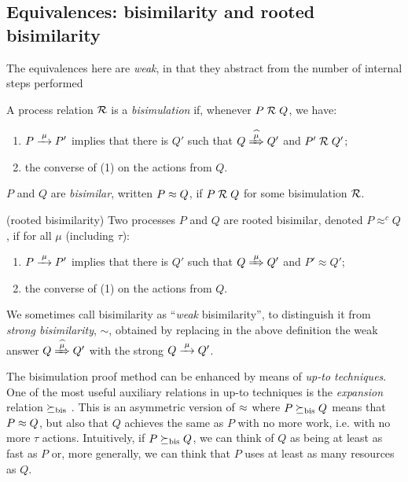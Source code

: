 \subsection{Equivalences: bisimilarity and rooted bisimilarity}
\label{ss:BiEx}

The equivalences here are 
 \emph{weak}, in that they
abstract from the number of internal steps performed
\begin{definition}[bisimilarity]
\label{d:wb}
A process relation ${{\cal R}}$ 
 is a \emph{bisimulation} if, whenever
 $P\mathrel{\cal R} Q$, %
we have:
\begin{enumerate}
\item 
    $P \arr\mu P'$   implies that there is $Q'$ such that $Q \Arcap \mu Q'$ and $P' \mathrel{\cal R} Q'$;
\item the converse of (1)
 on the actions from $Q$.
\end{enumerate}  
 $P$ and $Q$ are \emph{bisimilar},
written $P \approx
 Q$, if $P \mathrel{\cal R} Q$ for some  bisimulation ${\cal R}$.  
\end{definition} 

\begin{definition}{(rooted bisimilarity)}
Two processes $P$ and $Q$ are rooted bisimilar, denoted $P
\approx^c Q$, if for all $\mu$ (including $\tau$):
\begin{enumerate}
 \item  $P \arr\mu P'$   implies that there is $Q'$ such that $Q
   \Arr\mu Q'$ and $P' \approx Q'$;
\item the converse of (1) on the actions from $Q$.
\end{enumerate}
\end{definition}

We sometimes call bisimilarity as ``\emph{weak} bisimilarity'', to
distinguish it from \emph{strong bisimilarity}, $\sim$,
obtained by replacing in the above definition   the weak answer $
Q\Arcap\mu Q'$ with the strong  $Q \arr \mu Q'$.

The bisimulation proof method can be enhanced by means of \emph{up-to
  techniques}. One of the most useful auxiliary relations in up-to
techniques  is the \emph{expansion} relation  $\mathrel{\succeq_{\rm{bis}}}$ \cite{SaMi92}. This is an asymmetric version
of $\approx$ where $P \mathrel{\succeq_{\rm{bis}}} Q$  means that 
 $P \approx Q$,
but also that $Q$  achieves  the same as  $P$ 
with  no more work, i.e. with no more $\tau$ actions.
Intuitively, if $ P \mathrel{\succeq_{\rm{bis}}} Q$, we can think of $Q$ as being 
at least as fast as $P$
or, more generally, we can think that $P$  uses at least as many resources as $Q$. 



